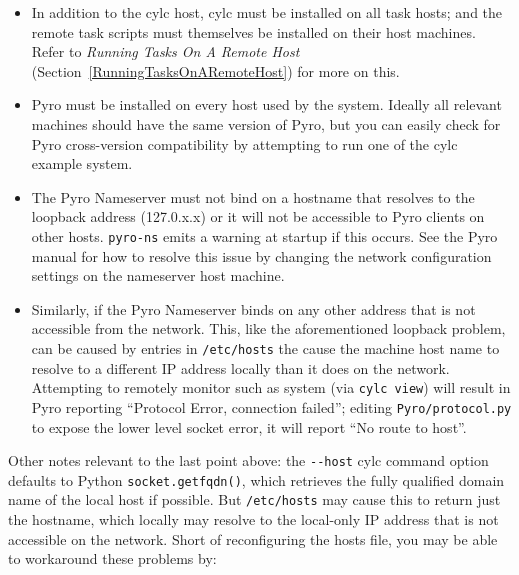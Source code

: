 \documentclass[11pt,a4paper]{article}
\begin{document}
\begin{itemize}

    \item In addition to the cylc host, cylc must be installed on all
        task hosts; and the remote task scripts must
        themselves be installed on their host machines.  Refer to {\em
        Running Tasks On A Remote Host}
        (Section~\ref{RunningTasksOnARemoteHost}) for more on this.

    \item Pyro must be installed on every host used by the system.
         Ideally all relevant machines should have the same version of
         Pyro, but you can easily check for Pyro cross-version
         compatibility by attempting to run one of the cylc example
         system.
        
    \item The Pyro Nameserver must not bind on a hostname that resolves
        to the loopback address (127.0.x.x) or it will not be accessible
        to Pyro clients on other hosts.  \lstinline=pyro-ns= emits a
        warning at startup if this occurs.  See the Pyro manual for how
        to resolve this issue by changing the network configuration
        settings on the nameserver host machine. 

    \item Similarly, if the Pyro Nameserver binds on any other address
        that is not accessible from the network. This, like the
        aforementioned loopback problem, can be caused by entries in
        \lstinline=/etc/hosts= the cause the machine host name to
        resolve to a different IP address locally than it does on the
        network. Attempting to remotely monitor such as system (via
        \lstinline=cylc view=) will result in Pyro reporting 
        ``Protocol Error, connection failed''; editing 
        \lstinline=Pyro/protocol.py= to expose the lower level 
        socket error, it will report ``No route to host''.

\end{itemize}

Other notes relevant to the last point above: the \lstinline=--host=
cylc command option defaults to Python \lstinline=socket.getfqdn()=,
which retrieves the fully qualified domain name of the local host
if possible.  But \lstinline=/etc/hosts= may cause this to return
just the hostname, which locally may resolve to the local-only IP
address that is not accessible on the network.  Short of reconfiguring
the hosts file, you may be able to workaround these problems by:
\end{document}
